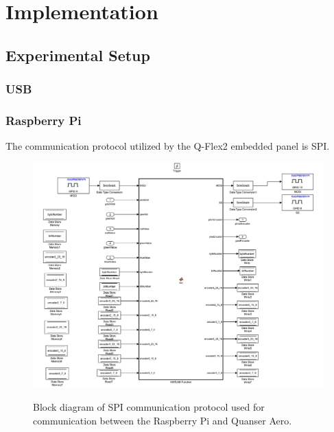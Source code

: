 \chapter{Implementation}

\section{Experimental Setup}

\subsection{USB}


\subsection{Raspberry Pi}
The communication protocol utilized by the Q-Flex2 embedded panel is SPI.  
\begin{figure}[!htbp]
    \centering
    \includegraphics[width=.46\textwidth,keepaspectratio=true]{figs/img/SPI_COM.pdf}
    \label{fig:SPI_COM}
    \caption{Block diagram of SPI communication protocol used for communication between the Raspberry Pi and Quanser Aero.}
\end{figure}


